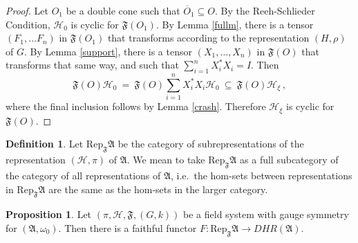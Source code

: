 \documentclass[12pt]{article}
\newcommand{\alg}[1]{\mathfrak{#1}}
\theoremstyle{definition}
\newtheorem{prop}[thm]{Proposition}
\theoremstyle{definition}
\newtheorem{defn}[thm]{Definition}
\theoremstyle{remark}
\def\2#1{{\mathcal #1}}
\def\ol#1{{\overline #1}}
\def\al#1{{\mathfrak #1}}
\def\om{\omega} \def\Om{\Omega} \def\dd{\partial} \def\D{\Delta}
\newcommand{\Rep}{\mathrm{Rep}}
\newcommand{\fields}{(\pi ,\2H ,\alg{F},(G,k))}
\begin{document}
\begin{proof} Let $O_1$ be a double cone such that $\ol O_1\subseteq
  O$.  By the Reeh-Schlieder Condition, $\2H _0$ is cyclic for $\al
  F(O_1)$.  By Lemma \ref{fullm}, there is a tensor $(F_1,\dots F_n)$
  in $\al F (O_1)$ that transforms according to the representation
  $(H,\rho )$ of $G$.  By Lemma \ref{support}, there is a tensor
  $(X_1,\dots ,X_n)$ in $\al F(O)$ that transforms that same way, and
  such that $\sum _{i=1}^{n}X_i^*X_i=I$.  Then
$$ \al F(O)\2H _0 \:=\: \al F(O)\sum _{i=1}^{n}X_i^*X_i\2H _0 \:\subseteq \:
\al F(O)\2H _{\xi} \, ,$$ where the final inclusion follows by Lemma
\ref{crash}.  Therefore $\2H _{\xi}$ is cyclic for $\al F(O)$.
\end{proof}


\begin{defn} Let $\Rep _{\al F}\al A$ be the category
  of subrepresentations of the representation $(\2H
  ,\pi )$ of $\al A$.  We mean to take $\Rep _{\al
    F}\al A$ as a full subcategory of the category of
  all representations of $\al A$, i.e.\ the hom-sets
  between representations in $\Rep _{\al F}\al A$ are
  the same as the hom-sets in the larger
  category.  \end{defn}

\begin{prop} Let $\fields$ be a field system with gauge
  symmetry for $(\al A,\om _0)$.  Then there is a
  faithful functor $F:\Rep _{\al F}\al A \to DHR(\al
  A)$.
  \label{uto}
\end{prop}
\end{document}
